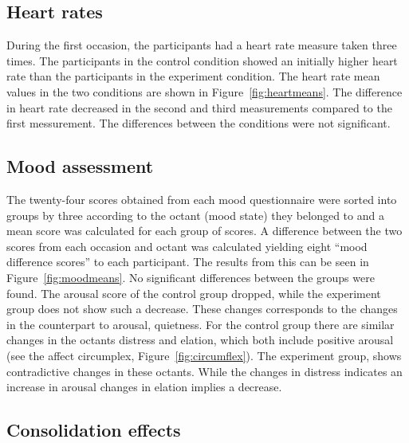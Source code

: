 \documentclass[jou,draftfirst,11pt]{apa6}
\newcommand{\figur}[1]{Figure~\ref{#1}}
\begin{document}
\subsection{Heart rates}

During the first occasion, the participants had a heart rate measure
taken three times. The participants in the control condition showed an
initially higher heart rate than the participants in the experiment
condition. The heart rate mean values in the two conditions are shown
in \figur{fig:heartmeans}.  The difference in heart rate
decreased in the second and third measurements compared to the first
messurement.  The differences between the conditions were not
significant.





\subsection{Mood assessment}

The twenty-four scores obtained from each mood questionnaire  were
sorted into groups by three according to the octant (mood state) they
belonged to and a mean score was calculated for each group of scores.
A difference between the two scores from each occasion and octant was
calculated yielding eight ``mood difference scores'' to each
participant.  The results from this can be seen in
\figur{fig:moodmeans}.  No significant differences between the groups
were found.  The arousal score of the control group dropped, while the
experiment group does not show such a decrease. These changes
corresponds to the changes in the counterpart to arousal, quietness.
For the control group there are similar changes in the octants
distress and elation, which both include positive arousal (see the
affect circumplex, \figur{fig:circumflex}). The experiment group,
shows contradictive changes in these octants. While the changes in
distress indicates an increase in arousal changes in elation implies a
decrease.







\subsection{Consolidation effects}
\end{document}
